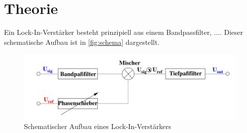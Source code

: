 \section{Theorie}
\label{sec:Theorie}
Ein Lock-In-Verstärker besteht prinzipiell aus einem Bandpassfilter, .... Dieser schematische Aufbau ist in \autoref{fig:schema} dargestellt.
\begin{figure}[H]
    \centering
    \includegraphics{images/schema.JPG}
    \caption{Schematischer Aufbau eines Lock-In-Verstärkers\cite{sample}}
    \label{fig:schema}
\end{figure}
\noindent